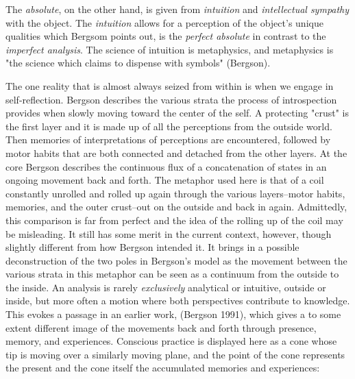\documentclass[11pt]{article}
\makeatletter
\newcommand{\cslcitation}[2]
 {\protect\hyper@linkstart{cite}{citeproc_bib_item_#1}#2\hyper@linkend}
\makeatother
\begin{document}
The \emph{absolute}, on the other hand, is given from \emph{intuition} and \emph{intellectual sympathy} with the object.
The \emph{intuition} allows for a perception of the object's unique qualities which Bergsom points out, is the \emph{perfect absolute} in contrast to the \emph{imperfect analysis}.
The science of intuition is metaphysics, and metaphysics is "the science which claims to dispense with symbols" (\cslcitation{2}{Bergson}).

The one reality that is almost always seized from within is when we engage in self-reflection.
Bergson describes the various strata the process of introspection provides when slowly moving toward the center of the self.
A protecting "crust" is the first layer and it is made up of all the perceptions from the outside world.
Then memories of interpretations of perceptions are encountered, followed by motor habits that are both connected and detached from the other layers.
At the core Bergson describes the continuous flux of a concatenation of states in an ongoing movement back and forth.
The metaphor used here is that of a coil constantly unrolled and rolled up again through the various layers--motor habits, memories, and the outer crust--out on the outside and back in again.
Admittedly, this comparison is far from perfect and the idea of the rolling up of the coil may be misleading.
It still has some merit in the current context, however, though slightly different from how Bergson intended it.
It brings in a possible deconstruction of the two poles in Bergson's model as the movement between the various strata in this metaphor can be seen as a continuum from the outside to the inside.
An analysis is rarely \emph{exclusively} analytical or intuitive, outside or inside, but more often a motion where both perspectives contribute to knowledge. 
This evokes a passage in an earlier work, (\cslcitation{3}{Bergson 1991}), which gives a to some extent different image of the movements back and forth through presence, memory, and experiences.
Conscious practice is displayed here as a cone whose tip is moving over a similarly moving plane, and the point of the cone represents the present and the cone itself the accumulated memories and experiences: 
\end{document}
